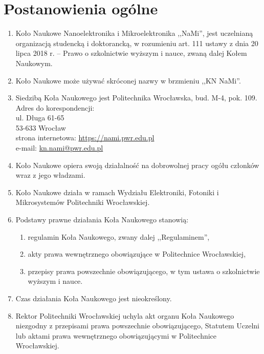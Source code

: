 \documentclass[12pt,a4paper]{article}
\begin{document}
\section{Postanowienia ogólne}
    \begin{enumerate}
        \item Koło Naukowe Nanoelektronika i Mikroelektronika ,,NaMi'', jest uczelnianą organizacją studencką i doktorancką, w rozumieniu art. 111 ustawy z dnia 20 lipca 2018 r. – Prawo o szkolnictwie wyższym i nauce, zwaną dalej Kołem Naukowym.
        \item Koło Naukowe może używać skróconej nazwy w brzmieniu ,,KN NaMi''.
        \item Siedzibą Koła Naukowego jest Politechnika Wrocławska, bud. M-4, pok. 109. \\
        Adres do korespondencji: \\
        ul. Długa 61-65 \\
        53-633 Wrocław \\
        strona internetowa: \url{https://nami.pwr.edu.pl} \\
        e-mail: \href{mailto:kn.nami@pwr.edu.pl}{kn.nami@pwr.edu.pl}

        \item Koło Naukowe opiera swoją działalność na dobrowolnej pracy ogółu członków wraz z jego władzami.
        \item Koło Naukowe działa w ramach Wydziału Elektroniki, Fotoniki i Mikrosystemów Politechniki Wrocławskiej.
        \item Podstawy prawne działania Koła Naukowego stanowią:
            \begin{enumerate}
                \item regulamin Koła Naukowego, zwany dalej ,,Regulaminem'',
                \item akty prawa wewnętrznego obowiązujące w Politechnice Wrocławskiej,
                \item przepisy prawa powszechnie obowiązującego, w tym ustawa o szkolnictwie wyższym i nauce.
            \end{enumerate}
        \item Czas działania Koła Naukowego jest nieokreślony.
        \item Rektor Politechniki Wrocławskiej uchyla akt organu Koła Naukowego niezgodny z przepisami prawa powszechnie obowiązującego, Statutem Uczelni lub aktami prawa wewnętrznego obowiązującymi w Politechnice Wrocławskiej.
    \end{enumerate}
\end{document}
